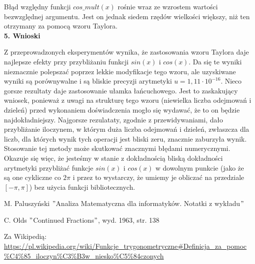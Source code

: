 \documentclass[a4paper]{article}
\begin{document}
Błąd względny funkcji $cos\_mult(x)$ rośnie wraz ze wzrostem wartości bezwzględnej argumentu. Jest on jednak siedem rzędów wielkości większy, niż ten otrzymany za pomocą wzoru Taylora.\\
\Large
\textbf{5. Wnioski}\\
\normalsize

Z przeprowadzonych eksperymentów wynika, że zastosowania wzoru Taylora daje najlepsze efekty przy przybliżaniu funkcji $sin(x)$ i $cos(x)$. Da się te wyniki nieznacznie polepszać poprzez lekkie modyfikacje tego wzoru, ale uzyskiwane wyniki są porównywalne i są bliskie precyzji arytmetyki $u = 1,11 \cdot 10^{-16}$. Nieco gorsze rezultaty daje zastosowanie ułamka łańcuchowego. Jest to zaskakujący wniosek, ponieważ z uwagi na strukturę tego wzoru (niewielka liczba odejmowań i dzieleń) przed wykonaniem doświadczenia mogło się wydawać, że to on będzie najdokładniejszy. Najgorsze rezulataty, zgodnie z przewidywaniami, dało przybliżanie iloczynem, w którym duża liczba odejmowań i dzieleń, zwłaszcza dla liczb, dla których wynik tych operacji jest bliski zeru, znacznie zaburzyła wynik. Stosowanie tej metody może skutkować znacznymi błędami numerycznymi.\\

Okazuje się więc, że jesteśmy w stanie z dokładnością bliską dokładności arytmetyki przybliżać funkcje $sin(x)$ i $cos(x)$ w dowolnym punkcie (jako że są one cykliczne co $2\pi$ i przez to wystarczy, że umiemy je obliczać na przedziale $ \left[ -\pi, \pi \right] $) bez użycia funkcji bibliotecznych.


\newpage
\begin{thebibliography}{9}
\itemsep2pt
 M. Paluszyński $"$Analiza Matematyczna dla informatyków. Notatki z wykładu$"$

 C. Olds $"$Continued Fractions$"$, wyd. 1963, str. 138

 Za Wikipedią: \url{https://pl.wikipedia.org/wiki/Funkcje_trygonometryczne#Definicja_za_pomoc%C4%85_iloczyn%C3%B3w_niesko%C5%84czonych}

\end{thebibliography}
\end{document}
